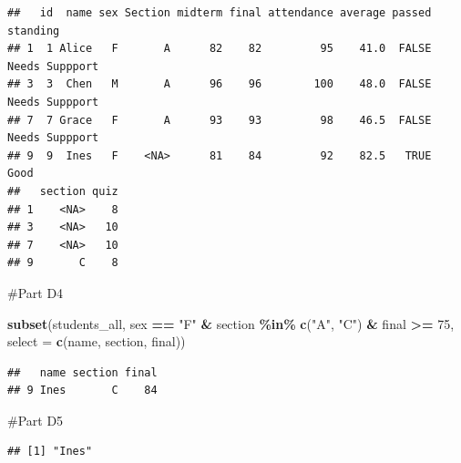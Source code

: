 \documentclass[
]{article}
\newenvironment{Shaded}{\begin{snugshade}}{\end{snugshade}}
\newcommand{\AttributeTok}[1]{\textcolor[rgb]{0.13,0.29,0.53}{#1}}
\newcommand{\DecValTok}[1]{\textcolor[rgb]{0.00,0.00,0.81}{#1}}
\newcommand{\FunctionTok}[1]{\textcolor[rgb]{0.13,0.29,0.53}{\textbf{#1}}}
\newcommand{\NormalTok}[1]{#1}
\newcommand{\SpecialCharTok}[1]{\textcolor[rgb]{0.81,0.36,0.00}{\textbf{#1}}}
\newcommand{\StringTok}[1]{\textcolor[rgb]{0.31,0.60,0.02}{#1}}
\begin{document}
\begin{verbatim}
##   id  name sex Section midterm final attendance average passed       standing
## 1  1 Alice   F       A      82    82         95    41.0  FALSE Needs Suppport
## 3  3  Chen   M       A      96    96        100    48.0  FALSE Needs Suppport
## 7  7 Grace   F       A      93    93         98    46.5  FALSE Needs Suppport
## 9  9  Ines   F    <NA>      81    84         92    82.5   TRUE           Good
##   section quiz
## 1    <NA>    8
## 3    <NA>   10
## 7    <NA>   10
## 9       C    8
\end{verbatim}

\#Part D4

\begin{Shaded}
\begin{Highlighting}[]
\FunctionTok{subset}\NormalTok{(students\_all,}
\NormalTok{       sex }\SpecialCharTok{==} \StringTok{"F"} \SpecialCharTok{\&}\NormalTok{ section }\SpecialCharTok{\%in\%} \FunctionTok{c}\NormalTok{(}\StringTok{"A"}\NormalTok{, }\StringTok{"C"}\NormalTok{) }\SpecialCharTok{\&}\NormalTok{ final }\SpecialCharTok{\textgreater{}=} \DecValTok{75}\NormalTok{,}
       \AttributeTok{select =} \FunctionTok{c}\NormalTok{(name, section, final))}
\end{Highlighting}
\end{Shaded}

\begin{verbatim}
##   name section final
## 9 Ines       C    84
\end{verbatim}

\#Part D5

\begin{Shaded}
\end{Shaded}

\begin{verbatim}
## [1] "Ines"
\end{verbatim}

\begin{Shaded}
\end{Shaded}
\end{document}
